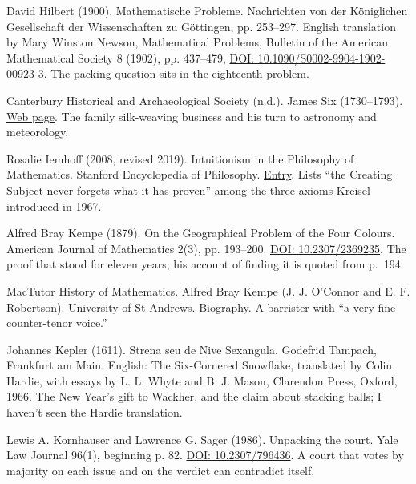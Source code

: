 \documentclass[11pt,twoside]{article}
\theoremstyle{thielethm}
\theoremstyle{thieledef}
\theoremstyle{thieledef}
\theoremstyle{thieledef}
\theoremstyle{thielethm}
\theoremstyle{thieleobs}
\theoremstyle{thielethm}
\begin{document}
\noindent David Hilbert (1900). Mathematische Probleme. Nachrichten von der K\"oniglichen Gesellschaft der Wissenschaften zu G\"ottingen, pp. 253--297. English translation by Mary Winston Newson, Mathematical Problems, Bulletin of the American Mathematical Society 8 (1902), pp. 437--479, \href{https://doi.org/10.1090/S0002-9904-1902-00923-3}{DOI: 10.1090/S0002-9904-1902-00923-3}. The packing question sits in the eighteenth problem.
\par\medskip

\noindent Canterbury Historical and Archaeological Society (n.d.). James Six (1730--1793). \href{https://www.canterbury-archaeology.org.uk/six-james-biog}{Web page}. The family silk-weaving business and his turn to astronomy and meteorology.
\par\medskip

\noindent Rosalie Iemhoff (2008, revised 2019). Intuitionism in the Philosophy of Mathematics. Stanford Encyclopedia of Philosophy. \href{https://plato.stanford.edu/entries/intuitionism/}{Entry}. Lists ``the Creating Subject never forgets what it has proven'' among the three axioms Kreisel introduced in 1967.
\par\medskip

\noindent Alfred Bray Kempe (1879). On the Geographical Problem of the Four Colours. American Journal of Mathematics 2(3), pp. 193--200. \href{https://doi.org/10.2307/2369235}{DOI: 10.2307/2369235}. The proof that stood for eleven years; his account of finding it is quoted from p.~194.
\par\medskip

\noindent MacTutor History of Mathematics. Alfred Bray Kempe (J. J. O'Connor and E. F. Robertson). University of St Andrews. \href{https://mathshistory.st-andrews.ac.uk/Biographies/Kempe/}{Biography}. A barrister with ``a very fine counter-tenor voice.''
\par\medskip

\noindent Johannes Kepler (1611). Strena seu de Nive Sexangula. Godefrid Tampach, Frankfurt am Main. English: The Six-Cornered Snowflake, translated by Colin Hardie, with essays by L. L. Whyte and B. J. Mason, Clarendon Press, Oxford, 1966. The New Year's gift to Wackher, and the claim about stacking balls; I haven't seen the Hardie translation.
\par\medskip

\noindent Lewis A. Kornhauser and Lawrence G. Sager (1986). Unpacking the court. Yale Law Journal 96(1), beginning p. 82. \href{https://doi.org/10.2307/796436}{DOI: 10.2307/796436}. A court that votes by majority on each issue and on the verdict can contradict itself.
\par\medskip
\end{document}
